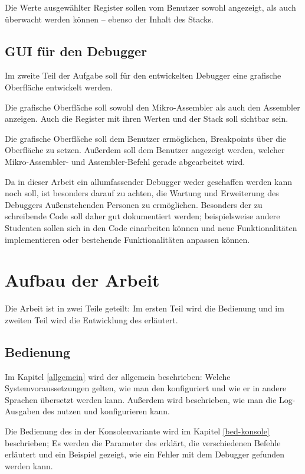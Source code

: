 Die Werte ausgewählter Register sollen vom Benutzer sowohl angezeigt, als auch überwacht werden können -- ebenso der Inhalt des Stacks.

\subsection*{GUI für den Debugger}
Im zweite Teil der Aufgabe soll für den entwickelten Debugger eine grafische  Oberfläche entwickelt werden.

Die grafische Oberfläche soll sowohl den Mikro-Assembler als auch den Assembler anzeigen. Auch die Register mit ihren Werten und der Stack soll sichtbar sein.

Die grafische Oberfläche soll dem Benutzer ermöglichen, Breakpoints über die Oberfläche zu setzen. Außerdem soll dem Benutzer angezeigt werden, welcher Mikro-Assembler- und Assembler-Befehl gerade abgearbeitet wird.

Da in dieser Arbeit ein allumfassender Debugger weder geschaffen werden kann noch soll, ist besonders darauf zu achten, die Wartung und Erweiterung des Debuggers Außenstehenden Personen zu ermöglichen. Besonders der zu schreibende Code soll daher gut dokumentiert werden; beispielsweise andere Studenten sollen sich in den Code einarbeiten können und neue Funktionalitäten implementieren oder bestehende Funktionalitäten anpassen können.

\section*{Aufbau der Arbeit}
Die Arbeit ist in zwei Teile geteilt: Im ersten Teil wird die Bedienung und im zweiten Teil wird die Entwicklung des \md{} erläutert.

\subsection*{Bedienung}
Im Kapitel \ref{allgemein} wird der \md{} allgemein beschrieben: Welche Systemvoraussetzungen gelten, wie man den \md{} konfiguriert und wie er in andere Sprachen übersetzt werden kann. Außerdem wird beschrieben, wie man die Log-Ausgaben des \md{} nutzen und konfigurieren kann.

Die Bedienung des \md{} in der Konsolenvariante wird im Kapitel \ref{bed-konsole} beschrieben; Es werden die Parameter des \md{} erklärt, die verschiedenen Befehle erläutert und ein Beispiel gezeigt, wie ein Fehler mit dem Debugger gefunden werden kann.

